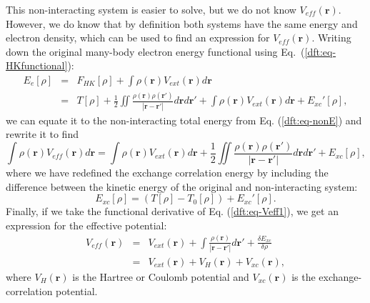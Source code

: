 \begin{refsection}
This non-interacting system is easier to solve, but we do not know 
$V_{eff}(\mathbf{r})$. However, we do know that by definition both systems 
have the same energy and electron density, which can be used to find an 
expression for $V_{eff}(\mathbf{r})$. Writing down the original many-body 
electron energy functional using Eq.~(\ref{dft:eq-HKfunctional}): 
\begin{eqnarray*} 
E_e[\rho] &=& F_{HK}[\rho] + \int \rho(\mathbf{r}) V_{ext}(\mathbf{r}) 
d\mathbf{r} 
\\ &= &T[\rho] + \frac{1}{2} \iint 
\frac{\rho(\mathbf{r})\rho(\mathbf{r'})}{\left| \mathbf{r} - 
\mathbf{r'}\right|} d\mathbf{r} d\mathbf{r'} + \int \rho(\mathbf{r}) 
V_{ext}(\mathbf{r}) d\mathbf{r} + E_{xc}'[\rho], 
\end{eqnarray*} 
we can equate it to the non-interacting total energy from Eq. (\ref{dft:eq-nonE}) 
and rewrite it to find 
\begin{equation}\label{dft:eq-Veff1} 
\int \rho(\mathbf{r}) V_{eff}(\mathbf{r}) d\mathbf{r} = \int \rho(\mathbf{r}) 
V_{ext}(\mathbf{r}) d\mathbf{r} + \frac{1}{2} \iint 
\frac{\rho(\mathbf{r})\rho(\mathbf{r'})}{\left| \mathbf{r} - 
\mathbf{r'}\right|}d\mathbf{r}d\mathbf{r'} + E_{xc}[\rho], 
\end{equation} 
where we have redefined the exchange correlation energy by including the 
difference between the kinetic energy of the original and non-interacting 
system: 
\begin{equation} 
E_{xc}[\rho] = (T[\rho] - T_0[\rho]) + E_{xc}'[\rho]. 
\end{equation} 
Finally, if we take the functional derivative of Eq. (\ref{dft:eq-Veff1}), we get 
an expression for the effective potential: 
\begin{eqnarray} 
V_{eff}(\mathbf{r}) &=& V_{ext}(\mathbf{r}) + \int \frac{\rho 
(\mathbf{r})}{\left| \mathbf{r} - \mathbf{r'} \right|} d\mathbf{r'} + 
\frac{\delta E_{xc}}{\delta \rho} 
\\ \label{dft:eq-Veff}&=& V_{ext}(\mathbf{r}) + V_{H}(\mathbf{r}) + 
V_{xc}(\mathbf{r}), 
\end{eqnarray} 
where $V_H(\mathbf{r})$ is the Hartree or Coulomb potential and 
$V_{xc}(\mathbf{r})$ is the exchange-correlation potential. 
 

\end{refsection}
